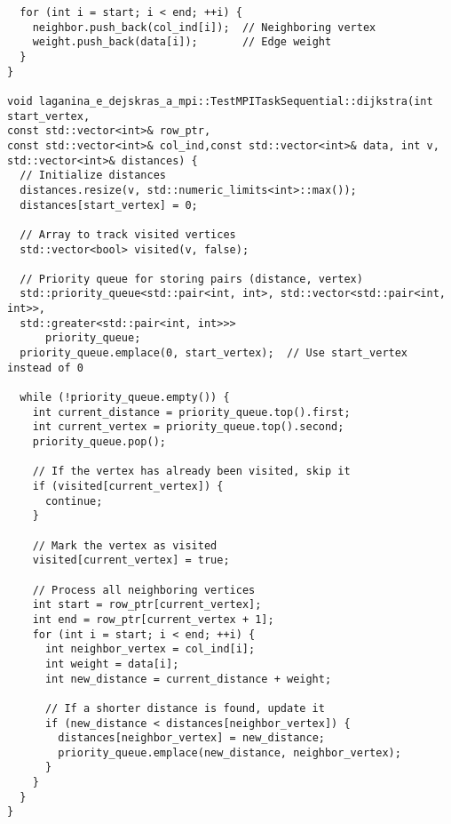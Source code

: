\documentclass[12pt]{article}
\begin{document}
\begin{verbatim}
  for (int i = start; i < end; ++i) {
    neighbor.push_back(col_ind[i]);  // Neighboring vertex
    weight.push_back(data[i]);       // Edge weight
  }
}

void laganina_e_dejskras_a_mpi::TestMPITaskSequential::dijkstra(int start_vertex, 
const std::vector<int>& row_ptr,
const std::vector<int>& col_ind,const std::vector<int>& data, int v,
std::vector<int>& distances) {
  // Initialize distances
  distances.resize(v, std::numeric_limits<int>::max());
  distances[start_vertex] = 0;

  // Array to track visited vertices
  std::vector<bool> visited(v, false);

  // Priority queue for storing pairs (distance, vertex)
  std::priority_queue<std::pair<int, int>, std::vector<std::pair<int, int>>, 
  std::greater<std::pair<int, int>>>
      priority_queue;
  priority_queue.emplace(0, start_vertex);  // Use start_vertex instead of 0

  while (!priority_queue.empty()) {
    int current_distance = priority_queue.top().first;
    int current_vertex = priority_queue.top().second;
    priority_queue.pop();

    // If the vertex has already been visited, skip it
    if (visited[current_vertex]) {
      continue;
    }

    // Mark the vertex as visited
    visited[current_vertex] = true;

    // Process all neighboring vertices
    int start = row_ptr[current_vertex];
    int end = row_ptr[current_vertex + 1];
    for (int i = start; i < end; ++i) {
      int neighbor_vertex = col_ind[i];
      int weight = data[i];
      int new_distance = current_distance + weight;

      // If a shorter distance is found, update it
      if (new_distance < distances[neighbor_vertex]) {
        distances[neighbor_vertex] = new_distance;
        priority_queue.emplace(new_distance, neighbor_vertex);
      }
    }
  }
}
\end{verbatim}
\end{document}
